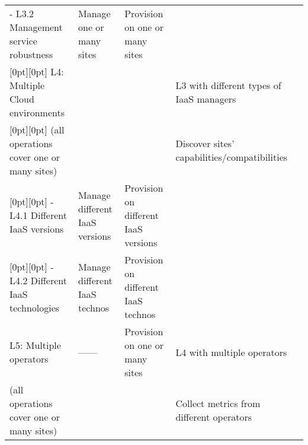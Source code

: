 \begin{tabular}{@{} l L L L @{} >{\kern\tabcolsep}l @{}}
    - L3.2 Management service robustness&
    Manage one or many sites &
    Provision on one or many sites&
    \\

    [0pt][0pt]
    L4: Multiple Cloud environments &
    &
    &
    L3 with different types of IaaS managers\\ 

    [0pt][0pt]
    (all operations cover one or many sites) &
    &
    &
    Discover sites' capabilities/compatibilities\\

    [0pt][0pt]
    - L4.1 Different IaaS versions&
    Manage different IaaS versions&
    Provision on different IaaS versions&
    \\
    
    [0pt][0pt]
    - L4.2 Different IaaS technologies&
    Manage different IaaS technos&
    Provision on different IaaS technos&
    \\

    L5: Multiple operators &
    \hfill ------ \hfill &
    Provision on one or many sites&
    L4 with multiple operators\\ 

    (all operations cover one or many sites) &
    &
    &
    Collect metrics from different operators\\
    \bottomrule

\end{tabular}

